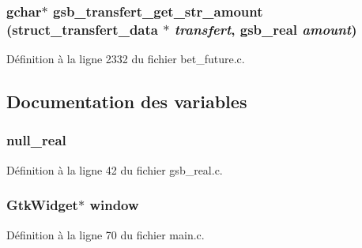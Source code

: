 \subsubsection[{gsb\_\-transfert\_\-get\_\-str\_\-amount}]{\setlength{\rightskip}{0pt plus 5cm}gchar$\ast$ gsb\_\-transfert\_\-get\_\-str\_\-amount ({\bf struct\_\-transfert\_\-data} $\ast$ {\em transfert}, \/  {\bf gsb\_\-real} {\em amount})}\label{bet__future_8c_a7ba318b5159699e3b2eca0a402826f8e}


Définition à la ligne 2332 du fichier bet\_\-future.c.



\subsection{Documentation des variables}
\subsubsection[{null\_\-real}]{ {\bf null\_\-real}}\label{bet__future_8c_a26f304bec3fdc0651b9aa8765d4de3c6}


Définition à la ligne 42 du fichier gsb\_\-real.c.

\subsubsection[{window}]{\setlength{\rightskip}{0pt plus 5cm}GtkWidget$\ast$ {\bf window}}\label{bet__future_8c_a3d346c08cf2d67c388caabffb412b293}


Définition à la ligne 70 du fichier main.c.

